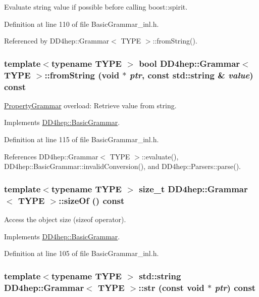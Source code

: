 Evaluate string value if possible before calling boost::spirit. 

Definition at line 110 of file BasicGrammar\_\-inl.h.

Referenced by DD4hep::Grammar$<$ TYPE $>$::fromString().\hypertarget{class_d_d4hep_1_1_grammar_a275a87cbf97f851be158441d373ae2b2}{
\subsubsection[{fromString}]{\setlength{\rightskip}{0pt plus 5cm}template$<$typename TYPE $>$ bool {\bf DD4hep::Grammar}$<$ TYPE $>$::fromString (void $\ast$ {\em ptr}, \/  const std::string \& {\em value}) const}}
\label{class_d_d4hep_1_1_grammar_a275a87cbf97f851be158441d373ae2b2}


\hyperlink{class_d_d4hep_1_1_property_grammar}{PropertyGrammar} overload: Retrieve value from string. 

Implements \hyperlink{class_d_d4hep_1_1_basic_grammar_adf08fd5e01cf623c8b0e239bbe0b1868}{DD4hep::BasicGrammar}.

Definition at line 115 of file BasicGrammar\_\-inl.h.

References DD4hep::Grammar$<$ TYPE $>$::evaluate(), DD4hep::BasicGrammar::invalidConversion(), and DD4hep::Parsers::parse().\hypertarget{class_d_d4hep_1_1_grammar_ab6c57bd9efbcd2964fa78864ebcf26c5}{
\subsubsection[{sizeOf}]{\setlength{\rightskip}{0pt plus 5cm}template$<$typename TYPE $>$ size\_\-t {\bf DD4hep::Grammar}$<$ TYPE $>$::sizeOf () const}}
\label{class_d_d4hep_1_1_grammar_ab6c57bd9efbcd2964fa78864ebcf26c5}


Access the object size (sizeof operator). 

Implements \hyperlink{class_d_d4hep_1_1_basic_grammar_a5e2ae03f6371357d3da7e082bbeabb0d}{DD4hep::BasicGrammar}.

Definition at line 105 of file BasicGrammar\_\-inl.h.\hypertarget{class_d_d4hep_1_1_grammar_a314d7a19d5f14066677c5fe3f2338291}{
\subsubsection[{str}]{\setlength{\rightskip}{0pt plus 5cm}template$<$typename TYPE $>$ std::string {\bf DD4hep::Grammar}$<$ TYPE $>$::str (const void $\ast$ {\em ptr}) const}}
\label{class_d_d4hep_1_1_grammar_a314d7a19d5f14066677c5fe3f2338291}


